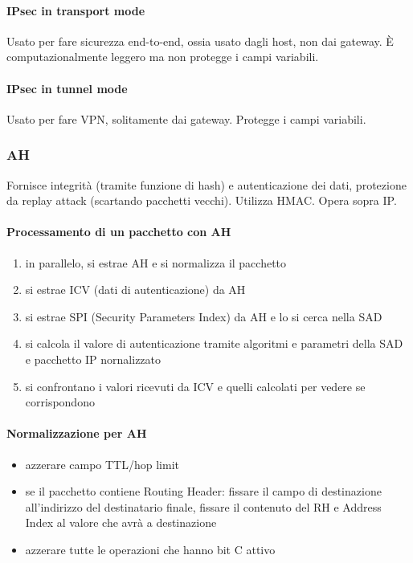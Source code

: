 \documentclass[11pt]{article}
\begin{document}
\paragraph*{IPsec in transport mode}
Usato per fare sicurezza end-to-end, ossia usato dagli host, non dai gateway. È computazionalmente leggero ma non protegge 
i campi variabili.
\paragraph*{IPsec in tunnel mode}
Usato per fare VPN, solitamente dai gateway. Protegge i campi variabili.
\subsubsection{AH}
Fornisce integrità (tramite funzione di hash) e autenticazione dei dati, protezione da replay attack (scartando pacchetti 
vecchi). Utilizza HMAC. Opera sopra IP.
\paragraph*{Processamento di un pacchetto con AH}
\begin{enumerate}
    \item in parallelo, si estrae AH e si normalizza il pacchetto 
    \item si estrae ICV (dati di autenticazione) da AH
    \item si estrae SPI (Security Parameters Index) da AH e lo si cerca nella SAD
    \item si calcola il valore di autenticazione tramite algoritmi e parametri della SAD e pacchetto IP nornalizzato 
    \item si confrontano i valori ricevuti da ICV e quelli calcolati per vedere se corrispondono
\end{enumerate}
\paragraph*{Normalizzazione per AH}
\begin{itemize}
    \item azzerare campo TTL/hop limit 
    \item se il pacchetto contiene Routing Header: fissare il campo di destinazione all'indirizzo del destinatario finale, 
    fissare il contenuto del RH e Address Index al valore che avrà a destinazione
    \item azzerare tutte le operazioni che hanno bit C attivo 
\end{itemize}
\end{document}
